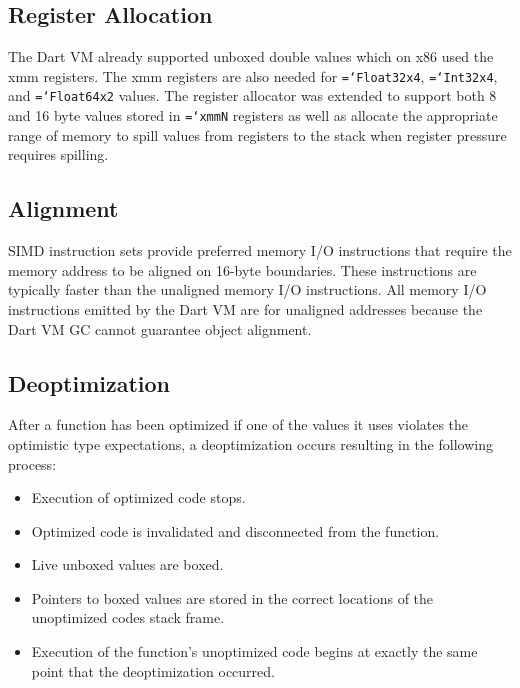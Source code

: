 \documentclass{sigplanconf}
\newcommand{\ttt}[1]{{\texttt{\hyphenchar\font=`\-\relax #1}}}%
\begin{document}
\subsection{Register Allocation}

The Dart VM already supported unboxed double values which on x86 used the xmm
registers. The xmm registers are also needed for \ttt{Float32x4}, \ttt{Int32x4},
and \ttt{Float64x2} values. The register allocator was extended to support both
8 and 16 byte values stored in \ttt{xmmN} registers as well as allocate the
appropriate range of memory to spill values from registers to the stack when
register pressure requires spilling.

\subsection{Alignment}

SIMD instruction sets provide preferred memory I/O instructions that require the
memory address to be aligned on 16-byte boundaries. These instructions are
typically faster than the unaligned memory I/O instructions. All memory I/O
instructions emitted by the Dart VM are for unaligned addresses because the Dart
VM GC cannot guarantee object alignment.

\subsection{Deoptimization}
\label{deoptimizing}

After a function has been optimized if one of the values it uses violates the
optimistic type expectations, a deoptimization occurs resulting in the following
process:

\begin{itemize}
\item
Execution of optimized code stops.

\item
Optimized code is invalidated and disconnected from the function.

\item
Live unboxed values are boxed.

\item
Pointers to boxed values are stored in the correct locations of the unoptimized
codes stack frame.

\item
Execution of the function's unoptimized code begins at exactly the same point
that the deoptimization occurred.

\end{itemize}
\end{document}
